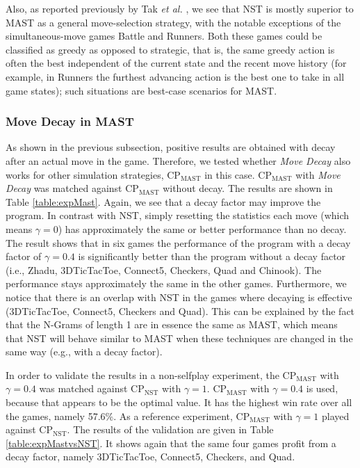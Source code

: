 \documentclass[journal]{IEEEtran}
\begin{document}
Also, as reported previously by Tak \emph{et al.} \cite{ngramArticle}, we see that NST is mostly superior to MAST as a general move-selection strategy, with the notable exceptions of the simultaneous-move games Battle and Runners. Both these games could be classified as greedy as opposed to strategic, that is, the same greedy action is often the best independent of the current state and the recent move history (for example, in Runners the furthest advancing action is the best one to take in all game states); such situations are best-case scenarios for MAST.









\subsubsection{Move Decay in MAST}
\label{subsubsec:decMast}

As shown in the previous subsection, positive results are obtained with decay after an actual move in the game. Therefore, we tested whether \textit{Move Decay} also works for other simulation strategies, CP$_{\textrm{MAST}}$ in this case. CP$_{\textrm{MAST}}$ with \textit{Move Decay} was matched against CP$_{\textrm{MAST}}$ without decay. The results are shown in Table \ref{table:expMast}. Again, we see that a decay factor may improve the program. In contrast with NST, simply resetting the statistics each move (which means $\gamma = 0$) has approximately the same or better performance than no decay. The result shows that in six games the performance of the program with a decay factor of $\gamma = 0.4$ is significantly better than the program without a decay factor (i.e., Zhadu, 3DTicTacToe, Connect5, Checkers, Quad and Chinook). The performance stays approximately the same in the other games. Furthermore, we notice that there is an overlap with NST in the games where decaying is effective (3DTicTacToe, Connect5, Checkers and Quad). This can be explained by the fact that the N-Grams of length 1 are in essence the same as MAST, which means that NST will behave similar to MAST when these techniques are changed in the same way (e.g., with a decay factor).

In order to validate the results in a non-selfplay experiment, the CP$_{\textrm{MAST}}$ with $\gamma = 0.4$ was matched against CP$_{\textrm{NST}}$ with $\gamma = 1$. CP$_{\textrm{MAST}}$ with $\gamma = 0.4$ is used, because that appears to be the optimal value. It has the highest win rate over all the games, namely 57.6\%. As a reference experiment, CP$_{\textrm{MAST}}$ with $\gamma = 1$ played against CP$_{\textrm{NST}}$. The results of the validation are given in Table \ref{table:expMastvsNST}. It shows again that the same four games profit from a decay factor, namely 3DTicTacToe, Connect5, Checkers, and Quad.
\end{document}
